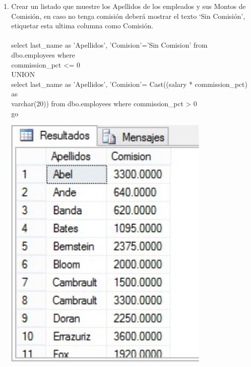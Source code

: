 \begin{enumerate}[1.]
	\item Crear un listado que muestre los Apellidos de los empleados y sus Montos de Comisión, en caso no tenga comisi\'on deber\'a mostrar el texto ‘Sin Comisi\'on’, etiquetar esta ultima columna como Comisi\'on.	
	\\
	\\select last\_name as 'Apellidos', 'Comision'='Sin Comision' from dbo.employees where 
	\\commission\_pct <= 0 
	\\UNION
	\\select last\_name as 'Apellidos', 'Comision'= Cast((salary * commission\_pct) as 	
	\\varchar(20)) from dbo.employees where commission\_pct > 0
	\\go
	\\
	\begin{center}
	\includegraphics[width=10cm]{./Imagenes/img04} 
	\end{center}


\end{enumerate}
